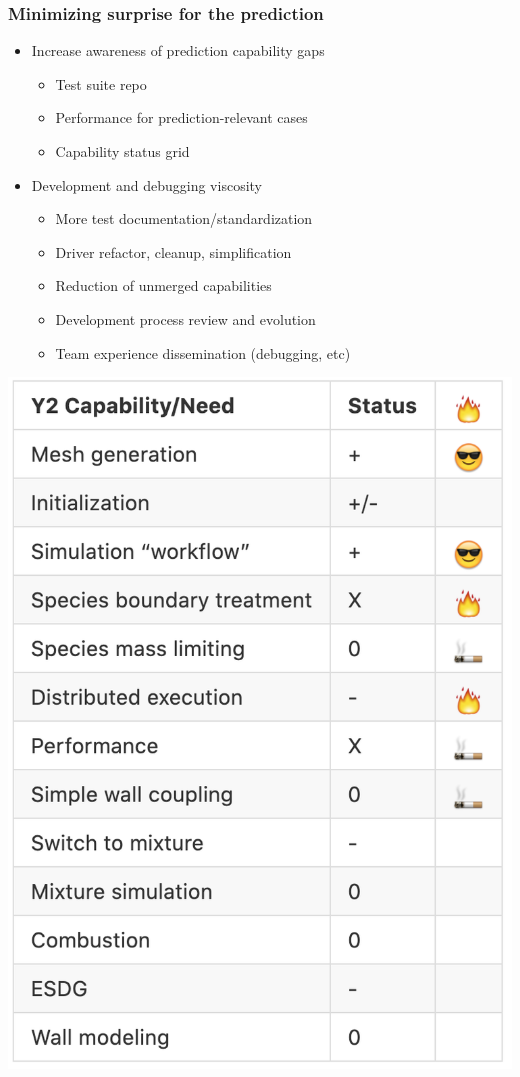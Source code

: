 \begin{frame}\frametitle{Minimizing surprise for the prediction}
\begin{multicols}{2}
\begin{itemize}
\item Increase awareness of prediction capability gaps
      \begin{itemize}
      \item Test suite repo  %
      \item Performance for prediction-relevant cases
      \item Capability status grid
      \end{itemize}
\item Development and debugging viscosity
      \begin{itemize}
      \item More test documentation/standardization
      \item Driver refactor, cleanup, simplification
      \item Reduction of unmerged capabilities
      \item Development process review and evolution
      \item Team experience dissemination (debugging, etc)
      \end{itemize}
\end{itemize}
\columnbreak
\includegraphics[width=.5\textwidth]{figures/PredictionCapabilityStatusChart.png}
\end{multicols}
\end{frame}

